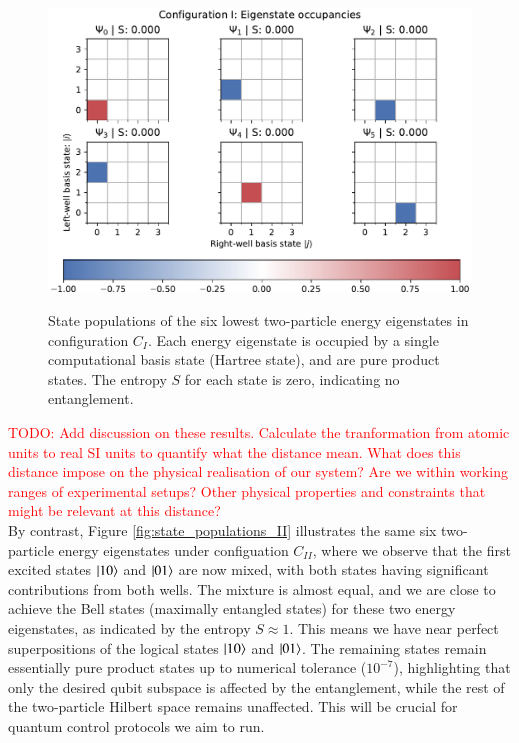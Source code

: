 \documentclass{subfiles}
\begin{document}
\begin{figure}[h!]
    \centering
    \includegraphics[width=1.0\textwidth]{figs/state_populations_I.pdf}
    \label{fig:state_populations_I}
    \caption{State populations of the six lowest two-particle energy eigenstates in configuration $C_I$. Each energy eigenstate is occupied by a single computational basis state (Hartree state), and are pure product states. The entropy $S$ for each state is zero, indicating no entanglement.}
\end{figure}
\textcolor{red}{TODO: Add discussion on these results. Calculate the tranformation from atomic units to real SI units to quantify what the distance mean. What does this distance impose on the physical realisation of our system? Are we within working ranges of experimental setups? Other physical properties and constraints that might be relevant at this distance?}
\\

By contrast, Figure \ref{fig:state_populations_II} illustrates the same six two-particle energy eigenstates under configuation $C_{II}$, where we observe that the first excited states $\ket{10}$ and $\ket{01}$ are now mixed, with both states having significant contributions from both wells. The mixture is almost equal, and we are close to achieve the Bell states (maximally entangled states) for these two energy eigenstates, as indicated by the entropy $S \approx 1$. This means we have near perfect superpositions of the logical states $\ket{10}$ and $\ket{01}$. The remaining states remain essentially pure product states up to numerical tolerance ($10^{-7}$), highlighting that only the desired qubit subspace is affected by the entanglement, while the rest of the two-particle Hilbert space remains unaffected. This will be crucial for quantum control protocols we aim to run.
\end{document}
